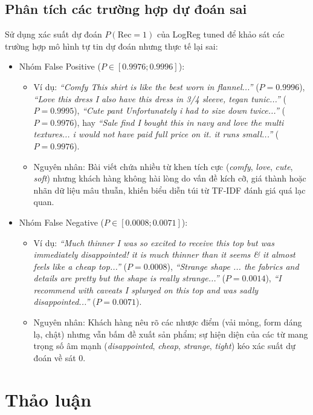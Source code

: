 \subsection{Phân tích các trường hợp dự đoán sai}
Sử dụng xác suất dự đoán $P(\text{Rec}=1)$ của LogReg tuned để khảo sát các trường hợp mô hình tự tin dự đoán nhưng thực tế lại sai:
\begin{itemize}
    \item Nhóm False Positive ($P \in [0.9976; 0.9996]$):
    \begin{itemize}
        \item Ví dụ: \textit{``Comfy This shirt is like the best worn in flannel...''} ($P = 0.9996$), \textit{``Love this dress I also have this dress in 3/4 sleeve, tegan tunic...''} ($P = 0.9995$), \textit{``Cute pant Unfortunately i had to size down twice...''} ($P = 0.9976$), hay \textit{``Sale find I bought this in navy and love the multi textures... i would not have paid full price on it. it runs small...''} ($P = 0.9976$).
        \item Nguyên nhân: Bài viết chứa nhiều từ khen tích cực (\textit{comfy}, \textit{love}, \textit{cute}, \textit{soft}) nhưng khách hàng không hài lòng do vấn đề kích cỡ, giá thành hoặc nhãn dữ liệu mâu thuẫn, khiến biểu diễn túi từ TF-IDF đánh giá quá lạc quan.
    \end{itemize}
    \item Nhóm False Negative ($P \in [0.0008; 0.0071]$):
    \begin{itemize}
        \item Ví dụ: \textit{``Much thinner I was so excited to receive this top but was immediately disappointed! it is much thinner than it seems \& it almost feels like a cheap top...''} ($P = 0.0008$), \textit{``Strange shape ... the fabrics and details are pretty but the shape is really strange...''} ($P = 0.0014$), \textit{``I recommend with caveats I splurged on this top and was sadly disappointed...''} ($P = 0.0071$).
        \item Nguyên nhân: Khách hàng nêu rõ các nhược điểm (vải mỏng, form dáng lạ, chật) nhưng vẫn bấm đề xuất sản phẩm; sự hiện diện của các từ mang trọng số âm mạnh (\textit{disappointed}, \textit{cheap}, \textit{strange}, \textit{tight}) kéo xác suất dự đoán về sát 0.
    \end{itemize}
\end{itemize}

\section{Thảo luận}

